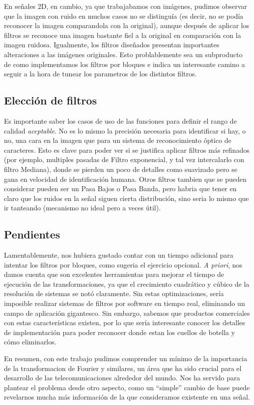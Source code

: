 En se\~nales 2D, en cambio, ya que trabajabamos con im\'agenes, pudimos observar que la imagen con ruido en muchos
casos no se distingu\'ia (es decir, no se pod\'ia reconocer la imagen comparandola con la original), aunque despu\'es
de aplicar los filtros se reconoce una imagen bastante fiel a la original en comparaci\'on con la imagen ruidosa. Igualmente,
los filtros dise\~nados presentan importantes alteraciones a las im\'agenes originales. Esto problablemente sea un subproducto de como
implementamos los filtros por bloques e indica un interesante camino a seguir a la hora de tunear los parametros de los distintos
filtros.

\subsection{Elecci\'on de filtros}

Es importante saber los casos de uso de las funciones para definir el rango de calidad \textit{aceptable}. No es lo mismo
la precisi\'on necesaria para identificar si hay, o no, una cara en la imagen que para un sistema de reconocimiento \'optico
de caracteres. Esto es clave para poder ver si se justifica aplicar filtros m\'as refinados (por ejemplo, multiples pasadas de 
Filtro exponencial, y tal vez intercalarlo con filtro Mediana), donde se pierden un poco de detalles como suavizado
pero se gana en velocidad de identificaci\'on humana. Otros filtros tambien que se pueden considerar pueden ser un Pasa Bajos o 
Pasa Banda, pero habria que tener en claro que los ruidos en la se\~nal siguen cierta distribuci\'on, sino seria lo mismo que ir
tanteando (mecanismo no ideal pero a veces \'util).

\subsection{Pendientes}

Lamentablemente, nos hubiera gustado contar con un tiempo adicional para intentar los filtros por bloques, como sugeria el ejercicio
opcional. \textit{A priori}, nos damos cuenta que son excelentes herramientas para mejorar el tiempo de ejecuci\'on
de las transformaciones, ya que el crecimiento cuadr\'atico y c\'ubico de la resoluci\'on de sistemas se not\'o claramente.
Sin estas optimizaciones, ser\'ia imposible realizar sistemas de filtros por software en tiempo real, eliminando un campo de 
aplicaci\'on gigantesco. Sin embargo, sabemos que productos comerciales con estas caracter\'isticas existen, por lo que
ser\'ia interesante conocer los detalles de implementaci\'on para poder reconocer donde estan los cuellos de botella y c\'omo
eliminarlos.

En resumen, con este trabajo pudimos comprender un m\'inimo de la importancia de la transformacion de Fourier y similares,
un \'area que ha sido crucial para el desarrollo de las telecomunicaciones alrededor del mundo. Nos ha servido para plantear
el problema desde otro aspecto, como un ``simple'' cambio de base puede revelarnos mucha m\'as informaci\'on de la que 
consideramos existente en una se\~nal. 

